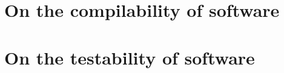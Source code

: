 \section{On the compilability of software}
\label{sec:buildability:related}


\section{On the testability of software}
\label{sec:testability:related}


